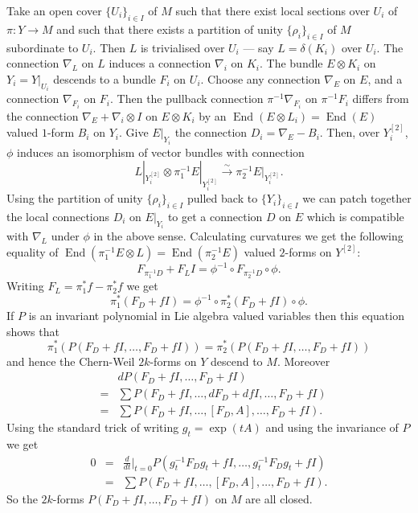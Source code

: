 \documentclass[a4paper,reqno]{amsart}
\DeclareMathOperator{\End}{End}
\theoremstyle{plain}
\theoremstyle{definition}
\theoremstyle{remark}
\numberwithin{equation}{section}
\numberwithin{figure}{section}
\newcommand{\<}{\langle}
\renewcommand{\>}{\rangle}
\begin{document}
Take an open cover $\{U_i\}_{i\in I}$ of $M$ such
that there exist local sections over $U_i$ of
$\pi\colon Y\to M$ and such that there exists a
partition of unity $\{\rho_i\}_{i\in I}$ of $M$
subordinate to $U_i$.  Then $L$ is trivialised over
$U_i$ --- say $L = \delta(K_i)$ over $U_i$.  The connection
$\nabla_L$ on $L$ induces a connection $\nabla_i$ on
$K_i$.  The bundle $E\otimes K_i$ on $Y_i = Y|_{U_i}$ descends
to a bundle $F_i$ on $U_i$.  Choose any connection
$\nabla_E$ on $E$, and a connection $\nabla_{F_i}$ on
$F_i$.  Then the pullback connection $\pi^{-1}\nabla_{F_i}$
on $\pi^{-1}F_i$ differs from the connection
$\nabla_E + \nabla_i\otimes I$ on $E\otimes K_i$
by an $\End(E\otimes L_i) = \End(E)$ valued $1$-form
$B_i$ on $Y_i$.  Give $E|_{Y_i}$ the connection
$D_i = \nabla_E - B_i$.  Then, over $Y^{[2]}_i$, $\phi$
induces an isomorphism of vector bundles with
connection
$$
L|_{Y_i^{[2]}}\otimes \pi_1^{-1}E|_{Y_i^{[2]}}
\stackrel{\sim}{\to} \pi_2^{-1}E|_{Y_i^{[2]}}.
$$
Using the partition of unity $\{\rho_i\}_{i\in I}$
pulled back to $\{Y_i\}_{i\in I}$ we can patch together
the local connections $D_i$ on $E|_{Y_i}$ to get a
connection $D$ on $E$ which is compatible with $\nabla_L$ under
$\phi$ in the above sense.
Calculating curvatures we get the following equality
of $\End(\pi_1^{-1}E\otimes L) = \End(\pi_2^{-1}E)$
valued $2$-forms on $Y^{[2]}$:
\begin{equation} 
\label{eq:module connection transfm law}
F_{\pi_1^{-1}D} + F_L I = \phi^{-1}\circ F_{\pi_2^{-1}D}
\circ \phi.
\end{equation} 
Writing $F_L = \pi_1^* f - \pi_2^* f$ we get
$$
\pi_1^*(F_{D} + f I) = \phi^{-1}\circ \pi_2^*(F_{D} + f I)\circ \phi.
$$
   If $P$ is an invariant polynomial in
Lie algebra valued variables then this
equation shows that $$
\pi_1^*(P(F_D + fI,\ldots ,F_D + fI)) = \pi_2^*(P(F_D + fI,\ldots ,F_D + fI))
$$
and hence the Chern-Weil $2k$-forms
on $Y$ descend to $M$.  Moreover
\begin{eqnarray*}
&   & dP(F_D+fI,\ldots ,F_D+fI) \\
& = & \sum P(F_D+fI,\ldots ,dF_D + dfI,\ldots ,F_D+fI) \\
& = & \sum P(F_D+fI,\ldots,[F_D,A],\ldots ,F_D+fI).
\end{eqnarray*}
Using the standard trick of writing $g_t = \exp (tA)$
and using the invariance of $P$ we get
\begin{eqnarray*}
0 & = & \frac{d}{dt}|_{t=0} P(g_t^{-1}F_Dg_t + fI,\ldots,
g_t^{-1}F_Dg_t + fI)                                       \\
& = & \sum P(F_D+fI,\ldots ,[F_D,A],\ldots ,F_D+fI).
\end{eqnarray*}
So the $2k$-forms $P(F_D+fI,\ldots ,F_D+fI)$ on
$M$ are all closed.
\end{document}
